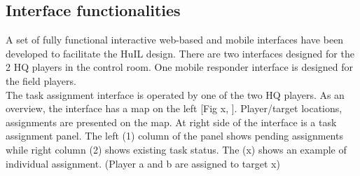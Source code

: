 \subsection{Interface functionalities}
A set of fully functional interactive web-based and mobile interfaces have been developed to facilitate the HuIL design. There are two interfaces designed for the 2 HQ players in the control room. One mobile responder interface is designed for the field players. \\

The task assignment interface is operated by one of the two HQ players. As an overview, the interface has a map on the left [Fig x, ]. Player/target locations, assignments are presented on the map. At right side of the interface is a task assignment panel. The left (1) column of the panel shows pending assignments while right column (2) shows existing task status. The (x) shows an example of individual assignment. (Player a and b are assigned to target x)\\

